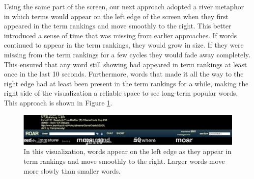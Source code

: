 Using the same part of the screen, our next approach adopted a river metaphor in which terms would appear on the left edge of the screen when they first appeared in the term rankings and move smoothly to the right. This better introduced a sense of time that was missing from earlier approaches. If words continued to appear in the term rankings, they would grow in size. If they were missing from the term rankings for a few cycles they would fade away completely. This ensured that any word still showing had appeared in term rankings at least once in the last 10 seconds. Furthermore, words that made it all the way to the right edge had at least been present in the term rankings for a while, making the right side of the visualization a reliable space to see long-term popular words. This approach is shown in Figure \ref{fig:pulse_river}.

\begin{figure}[tb]
	\includegraphics{figures/roar/river.png}
	\caption{In this visualization, words appear on the left edge as they appear in term rankings and move smoothly to the right. Larger words move more slowly than smaller words.}
	\label{fig:pulse_river}
\end{figure}

